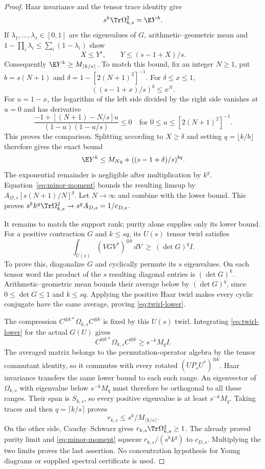 \begin{proof}
Haar invariance and the tensor trace identity give
\begin{equation}\label{eq:two-moments}
 s^k\Tr\Omega_{k,s}^2=\E Y^k.
\end{equation}
If $\lambda_1,\ldots,\lambda_s\in[0,1]$ are the eigenvalues of $G$, arithmetic--geometric mean and $1-\prod_i\lambda_i\le\sum_i(1-\lambda_i)$ show
\[
 X\le Y^s,\qquad Y\le(s-1+X)/s.
\]
Consequently $\E Y^k\ge M_{\lceil k/s\rceil}$. To match this bound, fix an integer $N\ge1$, put $b=s(N+1)$ and $\delta=1-[2(N+1)^2]^{-1}$. For $\delta\le x\le1$,
\[
 ((s-1+x)/s)^b\le x^N.
\]
For $u=1-x$, the logarithm of the left side divided by the right side vanishes at $u=0$ and has derivative
\[
 \frac{-1+[(N+1)-N/s]u}{(1-u)(1-u/s)}\le0
 \quad\text{for }0\le u\le[2(N+1)^2]^{-1}.
\]
This proves the comparison. Splitting according to $X\ge\delta$ and setting $q=\lfloor k/b\rfloor$ therefore gives the exact bound
\[
 \E Y^k\le M_{Nq}+((s-1+\delta)/s)^{bq}.
\]
The exponential remainder is negligible after multiplication by $k^g$. Equation~\eqref{eq:minor-moment} bounds the resulting limsup by $A_{D,s}[s(N+1)/N]^g$. Let $N\to\infty$ and combine with the lower bound. This proves $s^kk^g\Tr\Omega_{k,s}^2\to s^gA_{D,s}=1/c_{D,s}$.

It remains to match the support rank; purity alone supplies only its lower bound. For a positive contraction $G$ and $k\le sq$, its $U(s)$ tensor twirl satisfies
\begin{equation}\label{eq:twirl-lower}
 \int_{U(s)}(VGV^*)^{\otimes k}\,dV\ \ge\ (\det G)^q I.
\end{equation}
To prove this, diagonalize $G$ and cyclically permute its $s$ eigenvalues. On each tensor word the product of the $s$ resulting diagonal entries is $(\det G)^k$. Arithmetic--geometric mean bounds their average below by $(\det G)^q$, since $0\le\det G\le1$ and $k\le sq$. Applying the positive Haar twirl makes every cyclic conjugate have the same average, proving \eqref{eq:twirl-lower}.

The compression $C^{\otimes k*}\Omega_{k,s}C^{\otimes k}$ is fixed by this $U(s)$ twirl. Integrating \eqref{eq:twirl-lower} for the actual $G(U)$ gives
\[
 C^{\otimes k*}\Omega_{k,s}C^{\otimes k}\ge s^{-k}M_q I.
\]
The averaged matrix belongs to the permutation-operator algebra by the tensor commutant identity, so it commutes with every rotated $(UP_sU^*)^{\otimes k}$. Haar invariance transfers the same lower bound to each such range. An eigenvector of $\Omega_{k,s}$ with eigenvalue below $s^{-k}M_q$ must therefore be orthogonal to all these ranges. Their span is $S_{k,s}$, so every positive eigenvalue is at least $s^{-k}M_q$. Taking traces and then $q=\lceil k/s\rceil$ proves
\[
 r_{k,s}\le s^k/M_{\lceil k/s\rceil}.
\]
On the other side, Cauchy--Schwarz gives $r_{k,s}\Tr\Omega_{k,s}^2\ge1$. The already proved purity limit and \eqref{eq:minor-moment} squeeze $r_{k,s}/(s^kk^g)$ to $c_{D,s}$. Multiplying the two limits proves the last assertion. No concentration hypothesis for Young diagrams or supplied spectral certificate is used.
\end{proof}

